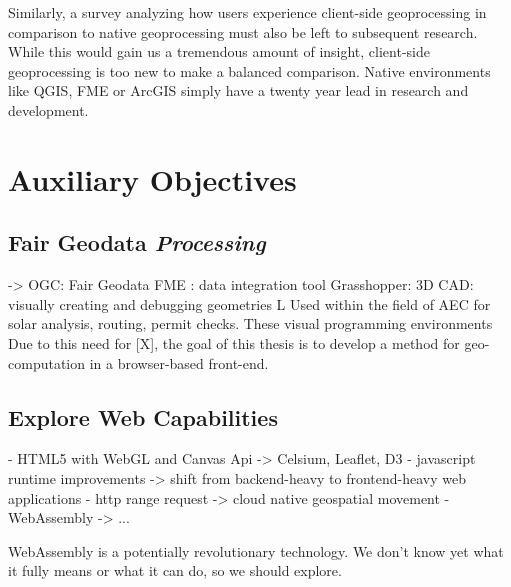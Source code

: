 Similarly, a survey analyzing how users experience client-side geoprocessing in comparison to native geoprocessing must also be left to subsequent research. While this would gain us a tremendous amount of insight, client-side geoprocessing is too new to make a balanced comparison. Native environments like QGIS, FME or ArcGIS simply have a twenty year lead in research and development. 





\section{Auxiliary Objectives}

\subsection*{Fair Geodata \emph{Processing}}
-> OGC: Fair Geodata
\m{->} FME : data integration tool
\m{->} Grasshopper: 3D CAD: visually creating and debugging geometries
       L \m{->} Used within the field of AEC for solar analysis, routing, permit checks.
These visual programming environments 
Due to this need for [X], the goal of this thesis is to develop a method for geo-computation in a browser-based front-end. 


\subsection*{Explore Web Capabilities }

- HTML5 with WebGL and Canvas Api -> Celsium, Leaflet, D3
- javascript runtime improvements -> shift from backend-heavy to frontend-heavy web applications
- http range request -> cloud native geospatial movement 
- WebAssembly -> ...

WebAssembly is a potentially revolutionary technology. We don't know yet what it fully means or what it can do, so we should explore.